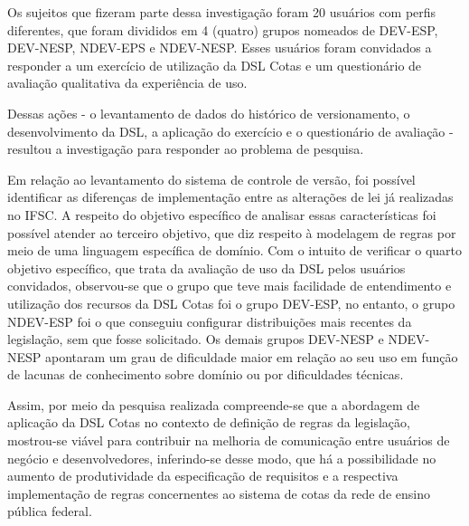 Os sujeitos que fizeram parte dessa investigação foram 20 usuários com perfis diferentes, que foram divididos em 4 (quatro) grupos nomeados de DEV-ESP, DEV-NESP, NDEV-EPS e NDEV-NESP. Esses usuários foram convidados a responder a um exercício de utilização da DSL Cotas e um questionário de avaliação qualitativa da experiência de uso. 
 
Dessas ações - o levantamento de dados do histórico de versionamento, o desenvolvimento da DSL, a aplicação do exercício e o questionário de avaliação - resultou a investigação para responder ao problema de pesquisa. 

Em relação ao levantamento do sistema de controle de versão, foi possível identificar as diferenças de implementação entre as alterações de lei já realizadas no \gls{IFSC}. A respeito do objetivo específico de analisar essas características foi possível atender ao terceiro objetivo, que diz respeito à modelagem de regras por meio de uma linguagem específica de domínio. Com o intuito de verificar o quarto objetivo específico, que trata da avaliação de uso da DSL pelos usuários convidados, observou-se que o grupo que teve mais facilidade de entendimento e utilização dos recursos da DSL Cotas foi o grupo DEV-ESP, no entanto, o grupo NDEV-ESP foi o que conseguiu configurar distribuições mais recentes da legislação, sem que fosse solicitado. Os demais grupos DEV-NESP e NDEV-NESP apontaram um grau de dificuldade maior em relação ao seu uso em função de lacunas de conhecimento sobre domínio ou por dificuldades técnicas.

Assim, por meio da pesquisa realizada compreende-se que a abordagem de aplicação da DSL Cotas no contexto de definição de regras da legislação, mostrou-se viável para contribuir na melhoria de comunicação entre usuários de negócio e desenvolvedores, inferindo-se desse modo, que há a possibilidade no aumento de produtividade da especificação de requisitos e a respectiva implementação de regras concernentes ao sistema de cotas da rede de ensino pública federal.


